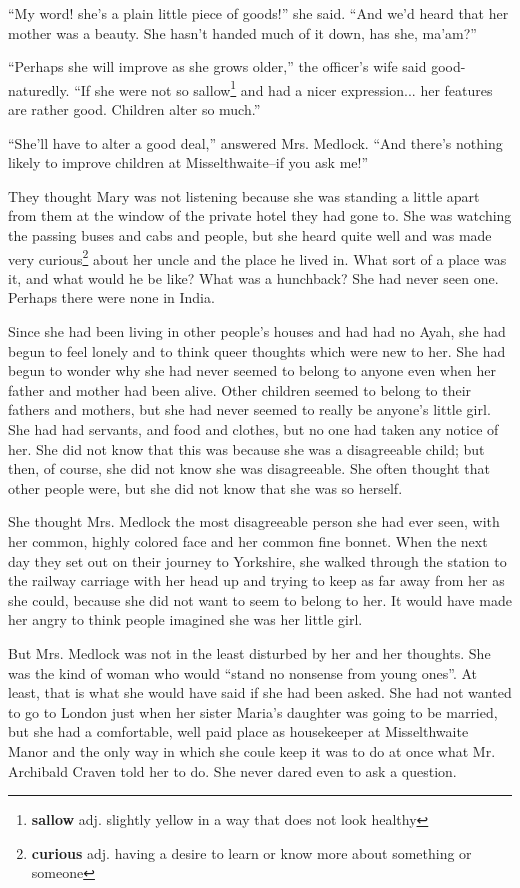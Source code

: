 ``My word! she's a plain little piece of goods!'' she said. ``And we'd heard that her mother was a beauty. She hasn't handed much of it down, has she, ma'am?''

``Perhaps she will improve as she grows older,'' the officer's wife said good-naturedly. ``If she were not so sallow\footnote{\textbf{sallow} adj. slightly yellow in a way that does not look healthy} and had a nicer expression... her features are rather good. Children alter so much.''

``She'll have to alter a good deal,'' answered Mrs. Medlock. ``And there's nothing likely to improve children at Misselthwaite--if you ask me!''

They thought Mary was not listening because she was standing a little apart from them at the window of the private hotel they had gone to. She was watching the passing buses and cabs and people, but she heard quite well and was made very curious\footnote{\textbf{curious} adj. having a desire to learn or know more about something or someone} about her uncle and the place he lived in. What sort of a place was it, and what would he be like? What was a hunchback? She had never seen one. Perhaps there were none in India.

Since she had been living in other people's houses and had had no Ayah, she had begun to feel lonely and to think queer thoughts which were new to her. She had begun to wonder why she had never seemed to belong to anyone even when her father and mother had been alive. Other children seemed to belong to their fathers and mothers, but she had never seemed to really be anyone's little girl. She had had servants, and food and clothes, but no one had taken any notice of her. She did not know that this was because she was a disagreeable child; but then, of course, she did not know she was disagreeable. She often thought that other people were, but she did not know that she was so herself.

She thought Mrs. Medlock the most disagreeable person she had ever seen, with her common, highly colored face and her common fine bonnet. When the next day they set out on their journey to Yorkshire, she walked through the station to the railway carriage with her head up and trying to keep as far away from her as she could, because she did not want to seem to belong to her. It would have made her angry to think people imagined she was her little girl.

But Mrs. Medlock was not in the least disturbed by her and her thoughts. She was the kind of woman who would ``stand no nonsense from young ones''. At least, that is what she would have said if she had been asked. She had not wanted to go to London just when her sister Maria's daughter was going to be married, but she had a comfortable, well paid place as housekeeper at Misselthwaite Manor and the only way in which she coule keep it was to do at once what Mr. Archibald Craven told her to do. She never dared even to ask a question.

